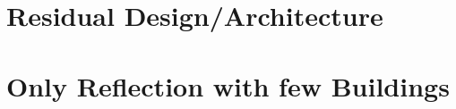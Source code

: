 	\clearpage
		
	\section{Residual Design/Architecture}
	\label{sec:experiments-residual_architecture}
		
		
		
		
		
		
	\section{Only Reflection with few Buildings}
	\label{sec:experiments-only_reflections_with_few_buildings}
		
		
		
		
		
	
	
	

